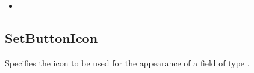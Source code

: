 \documentclass[letterpaper,12pt,english,openany,oneside]{sphinxmanual}
\begin{document}
\label{\detokenize{IAC_API_FormsIntro:related-methods-3}}
\begin{itemize}
\item {} 

\end{itemize}
\label{\detokenize{IAC_API_FormsIntro:example-2}}

\begin{sphinxVerbatim}[commandchars=\\\{\}]
  
\end{sphinxVerbatim}




\subsection{SetButtonIcon}
\label{\detokenize{IAC_API_FormsIntro:setbuttonicon}}
Specifies the icon to be used for the appearance of a field of type .

\label{\detokenize{IAC_API_FormsIntro:syntax-4}}

\begin{sphinxVerbatim}[commandchars=\\\{\}]
       
\end{sphinxVerbatim}
\label{\detokenize{IAC_API_FormsIntro:parameters-4}}
\end{document}
